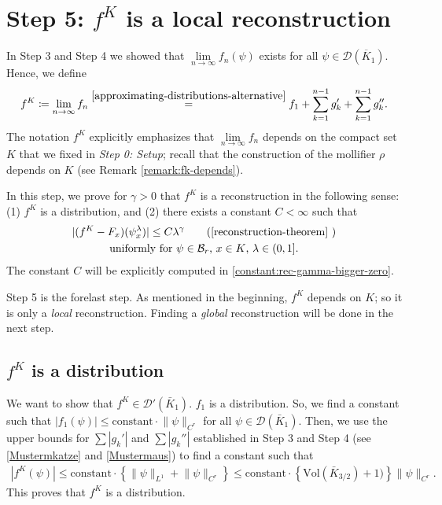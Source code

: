 \section{Step 5: \texorpdfstring{$f^K$ is a local reconstruction}{fK satisfies the reconstruction theorem}}

In Step 3 and Step 4 we showed that $\lim\limits_{n \to \infty}f_n(\psi)$ exists for all $\psi \in \mathcal{D}(\overline{K}_1)$. Hence, we define
\begin{align*}
    f^K \coloneqq \lim\limits_{n \to \infty}f_n \overset{\eqref{approximating-distributions-alternative}}{=} f_1 + \sum^{n-1}_{k=1} g_k' + \sum^{n-1}_{k=1} g_k''.
\end{align*}
The notation $f^K$ explicitly emphasizes that $\lim\limits_{n \to \infty}f_n$ depends on the compact set $K$ that we fixed in \emph{Step 0: Setup}; recall that the construction of the mollifier $\rho$  depends on $K$ (see Remark \ref{remark:fk-depends}).
 
In this step, we prove for $\gamma > 0$ that $f^K$ is a reconstruction in the following sense: (1) $f^K$ is a distribution, and (2) there exists a constant $C < \infty$ such that 
\begin{gather*}
    |(f^K - F_x)(\psi^\lambda_x)| \leq C \lambda^\gamma \tag{\ref{reconstruction-theorem}
    }\\ 
    \text{uniformly for $\psi \in \mathcal{B}_r$, $x \in K$, $\lambda \in (0,1]$}.
\end{gather*}
The constant $C$ will be explicitly computed in \eqref{constant:rec-gamma-bigger-zero}. 

Step 5 is the forelast step. As mentioned in the beginning, $f^K$ depends on $K$; so it is only a \emph{local} reconstruction. Finding a \emph{global} reconstruction will be done in the next step.

\subsection*{$f^K$ is a distribution} 

We want to show that $f^K \in \mathcal{D}'(\bar K_1)$. $f_1$ is a distribution. So, we find a constant such that $|f_1(\psi)| \leq \mathrm{constant} \cdot \lVert \psi \rVert_{C^r}$ for all $\psi \in \mathcal{D}(\bar K_1)$. Then, we use the upper bounds for $\sum |g_k'|$ and $\sum |g_k''|$ established in Step 3 and Step 4 (see  \eqref{Mustermkatze} and  \eqref{Mustermaus}) to find a constant such that  
\begin{align*}
    |f^K(\psi)| \leq \mathrm{constant} \cdot \left\{ \lVert \psi\rVert_{L^1} + \lVert \psi\rVert_{C^r} \right\} \leq  \mathrm{constant} \cdot \left\{  \mathrm{Vol}(\bar K_{3/2}) + 1) \right\} \lVert \psi \rVert_{C^r}.
\end{align*}
This proves that $f^K$ is a distribution. 


